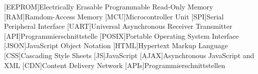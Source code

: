 \begin{acronym}[xxxxxxxxx]
  [EEPROM]{Electrically Erasable Programmable Read-Only Memory}
  [RAM]{Ramdom-Access Memory}
  [MCU]{Microcontroller Unit}
  [SPI]{Serial Peripheral Interface}
  [UART]{Universal Asynchronous Receiver Transmitter}
  [API]{Programmierschnittstelle}
  [POSIX]{Portable Operating System Interface}
  [JSON]{JavaScript Object Notation}
  [HTML]{Hypertext Markup Language}
  [CSS]{Cascading Style Sheets}
  [JS]{JavaScript}
  [AJAX]{Asynchronous JavaScript and XML}
  [CDN]{Content Delivery Network}
  [APIs]{Programmierschnittstellen}
  
\end{acronym}

